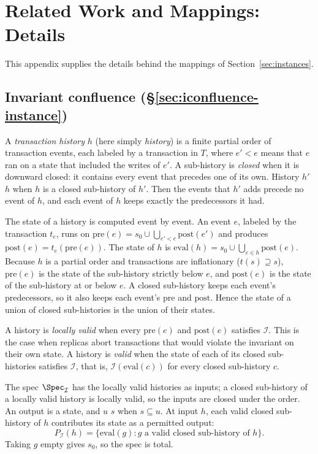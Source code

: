 \section{Related Work and Mappings: Details}
\label{app:related}

This appendix supplies the details behind the mappings of Section~\ref{sec:instances}.

\subsection{Invariant confluence (\S\ref{sec:iconfluence-instance})}
\label{app:iconfluence}

A \emph{transaction history} $h$ (here simply \emph{history}) is a finite
partial order of transaction events, each labeled by a transaction in $T$,
where $e'<e$ means that $e$ ran on a state that included the writes of $e'$.
A sub-history is \emph{closed} when it is downward closed: it contains every
event that precedes one of its own.  History
$h'$ \inrel $h$ when $h$ is a closed sub-history of $h'$.  Then the events
that $h'$ adds precede no event of $h$, and each event of $h$ keeps exactly
the predecessors it had.

The state of a history is computed event by event.  An event $e$, labeled by
the transaction $t_e$, runs on
$\mathrm{pre}(e)=s_0\cup\bigcup_{e'<e}\mathrm{post}(e')$ and produces
$\mathrm{post}(e)=t_e(\mathrm{pre}(e))$.  The state of $h$ is
$\mathrm{eval}(h)=s_0\cup\bigcup_{e\in h}\mathrm{post}(e)$.  Because $h$ is a
partial order and transactions are inflationary ($t(s)\supseteq s$),
$\mathrm{pre}(e)$ is the state of the sub-history strictly below $e$, and
$\mathrm{post}(e)$ is the state of the sub-history at or below $e$.  A
closed sub-history keeps each event's predecessors, so it also keeps each
event's $\mathrm{pre}$ and $\mathrm{post}$.  Hence the state of a union of
closed sub-histories is the union of their states.

A history is \emph{locally valid} when every $\mathrm{pre}(e)$ and
$\mathrm{post}(e)$ satisfies $\mathcal I$.  This is the case when replicas
abort transactions that would violate the invariant on their own state.  A
history is \emph{valid} when the state of each of its closed sub-histories
satisfies $\mathcal I$, that is, $\mathcal I(\mathrm{eval}(c))$ for every
closed sub-history $c$.

The spec $\Spec_{\mathcal I}$ has the locally valid histories as inputs;
a closed sub-history of a locally valid history is locally valid, so the
inputs are closed under the order.
An output is a state, and $u$ \outrel $s$ when $s\subseteq u$.  At input $h$,
each valid closed sub-history of $h$ contributes its state as a permitted
output:
\[
  P_{\mathcal I}(h)=\{\mathrm{eval}(g):g\text{ a valid closed
  sub-history of }h\}.
\]
Taking $g$ empty gives $s_0$, so the spec is total.

